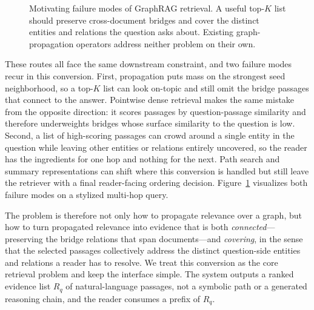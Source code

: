 \begin{figure}[t]
\centering
{}
\caption{Motivating failure modes of GraphRAG retrieval. A useful
top-$K$ list should preserve cross-document bridges and cover the
distinct entities and relations the question asks about. Existing
graph-propagation operators address neither problem on their own.}
\label{fig:motivation}
\end{figure}

These routes all face the same downstream constraint, and two
failure modes recur in this conversion. First, propagation puts
mass on the strongest seed neighborhood, so a top-$K$ list can look
on-topic and still omit the bridge passages that connect to the
answer. Pointwise dense retrieval makes the same mistake from the
opposite direction: it scores passages by question-passage
similarity and therefore underweights bridges whose surface
similarity to the question is low. Second, a list of high-scoring
passages can crowd around a single entity in the question while
leaving other entities or relations entirely uncovered, so the
reader has the ingredients for one hop and nothing for the next.
Path search and summary representations can shift where this
conversion is handled but still leave the retriever with a final
reader-facing ordering decision. Figure~\ref{fig:motivation}
visualizes both failure modes on a stylized multi-hop query.

The problem is therefore not only how to propagate relevance over a
graph, but how to turn propagated relevance into evidence that is
both \emph{connected}---preserving the bridge relations that span
documents---and \emph{covering}, in the sense that the selected
passages collectively address the distinct question-side entities
and relations a reader has to resolve. We treat this conversion as
the core retrieval problem and keep the interface simple. The
system outputs a ranked evidence list $R_q$ of natural-language
passages, not a symbolic path or a generated reasoning chain, and
the reader consumes a prefix of $R_q$.

